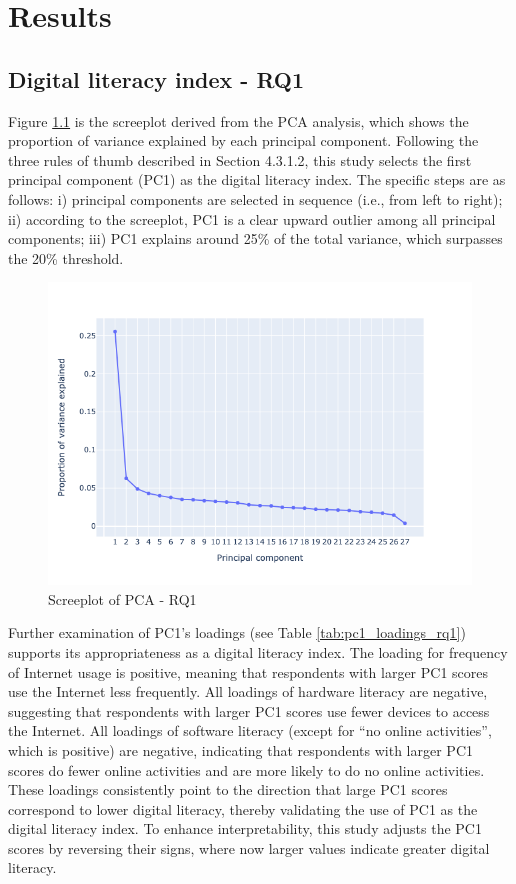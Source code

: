 \chapter{\label{ch:5-result}Results}

\section{Digital literacy index - RQ1}
Figure \ref{fig:screeplot_rq1} is the screeplot derived from the PCA analysis, which shows the proportion of variance explained by each principal component. Following the three rules of thumb \parencite[p. 212]{zelterman_applied_2015} described in Section 4.3.1.2, this study selects the first principal component (PC1) as the digital literacy index. The specific steps are as follows: i) principal components are selected in sequence (i.e., from left to right); ii) according to the screeplot, PC1 is a clear upward outlier among all principal components; iii) PC1 explains around 25\% of the total variance, which surpasses the 20\% threshold. 

\begin{figure}
    \centering
    \caption{Screeplot of PCA - RQ1}
    \label{fig:screeplot_rq1}
    \includegraphics[width=\textwidth]{figures/pca_screeplot_q1.png}
\end{figure}

Further examination of PC1's loadings (see Table \ref{tab:pc1_loadings_rq1}) supports its appropriateness as a digital literacy index. The loading for frequency of Internet usage is positive, meaning that respondents with larger PC1 scores use the Internet less frequently. All loadings of hardware literacy are negative, suggesting that respondents with larger PC1 scores use fewer devices to access the Internet. All loadings of software literacy (except for ``no online activities”, which is positive) are negative, indicating that respondents with larger PC1 scores do fewer online activities and are more likely to do no online activities. These loadings consistently point to the direction that large PC1 scores correspond to lower digital literacy, thereby validating the use of PC1 as the digital literacy index. To enhance interpretability, this study adjusts the PC1 scores by reversing their signs, where now larger values indicate greater digital literacy.

